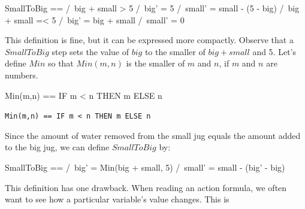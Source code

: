 \documentclass[fleqn,leqno]{article}
\begin{document}
\begin{display}
\begin{notla}
SmallToBig == \/ /\ big + small > 5
                 /\ big' = 5
                 /\ small' = small - (5 - big)
              \/ /\ big + small =< 5
                 /\ big' = big + small
                 /\ small' = 0
\end{notla}
\begin{tlatex}
%
%
%
%
%
%
%
%
\end{tlatex}
\end{display}
This definition is fine, but it can be expressed more compactly.
Observe that a $SmallToBig$ step sets the value of $big$ to the
smaller of $big+small$ and 5.  Let's define $Min$ so that $Min(m, n)$
is the smaller of $m$ and $n$, if $m$ and $n$ are numbers.
\begin{twocols}
\begin{notla}
Min(m,n) == IF m < n THEN m ELSE n
\end{notla}
\begin{tlatex}
%
\end{tlatex}
\midcol
\verb|Min(m,n) == IF m < n THEN m ELSE n|
\end{twocols}
Since the amount of water removed from the small jug equals the amount
added to the big jug, we can define $SmallToBig$ by:
\begin{display}
\begin{notla}
SmallToBig == /\ big' = Min(big + small, 5)
              /\ small' = small - (big' - big)
\end{notla}
\begin{tlatex}
\end{tlatex}
\end{display}
This definition has one drawback.  When reading an action formula, we
often want to see how a particular variable's value changes.  This is
\end{document}
